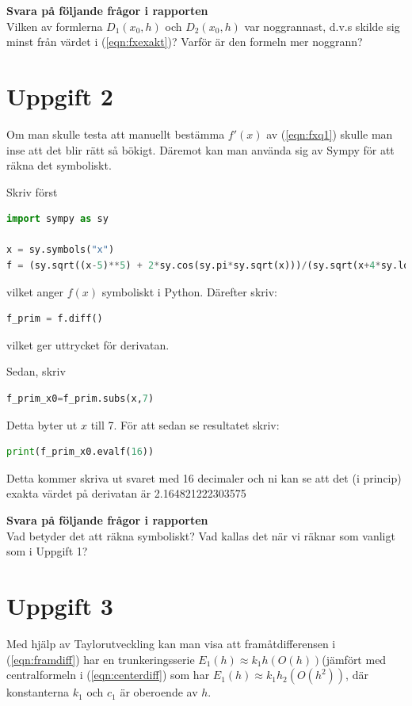 \documentclass[a4paper]{article}
\begin{document}
\textbf{Svara på följande frågor i rapporten}\\
Vilken av formlerna  \( D_1(x_0,h) \) och  \( D_2(x_0,h) \) var noggrannast,
d.v.s skilde sig minst från värdet i (\ref{eqn:fxexakt})? Varför är den formeln mer noggrann?


\section{Uppgift 2}
Om man skulle testa att manuellt bestämma \( f'(x) \) av (\ref{eqn:fxq1})
skulle man inse att det blir rätt så bökigt. Däremot kan man använda sig av Sympy för att räkna det symboliskt.

Skriv först
\begin{lstlisting}[language=Python]
import sympy as sy

x = sy.symbols("x")
f = (sy.sqrt((x-5)**5) + 2*sy.cos(sy.pi*sy.sqrt(x)))/(sy.sqrt(x+4*sy.log(x-sy.pi))-1)
\end{lstlisting}
vilket anger \( f(x) \) symboliskt i Python. Därefter skriv:

\begin{lstlisting}[language=Python]
  f_prim = f.diff()
\end{lstlisting}
vilket ger uttrycket för derivatan.

Sedan, skriv

\begin{lstlisting}[language=Python]
  f_prim_x0=f_prim.subs(x,7)
\end{lstlisting}
Detta byter ut \(x\)  till 7. För att sedan se resultatet skriv:

\begin{lstlisting}[language=Python]
  print(f_prim_x0.evalf(16))
\end{lstlisting}
Detta kommer skriva ut svaret med 16 decimaler och ni kan se
att det (i princip) exakta värdet på derivatan är 2.164821222303575


\textbf{Svara på följande frågor i rapporten}\\
Vad betyder det att räkna symboliskt?
Vad kallas det när vi räknar som vanligt som i Uppgift 1?

\newpage
\section{Uppgift 3}

Med hjälp av Taylorutveckling kan man visa att framåtdifferensen i (\ref{eqn:framdiff}) har
en trunkeringsserie \( E_1(h)\approx k_1h(O(h)) \)(jämfört med centralformeln i (\ref{eqn:centerdiff})
som har \(E_1(h)\approx k_1h_2(O(h^2))\), där konstanterna \(k_1\)  och \(c_1\)  är oberoende av \(h\).
\end{document}
